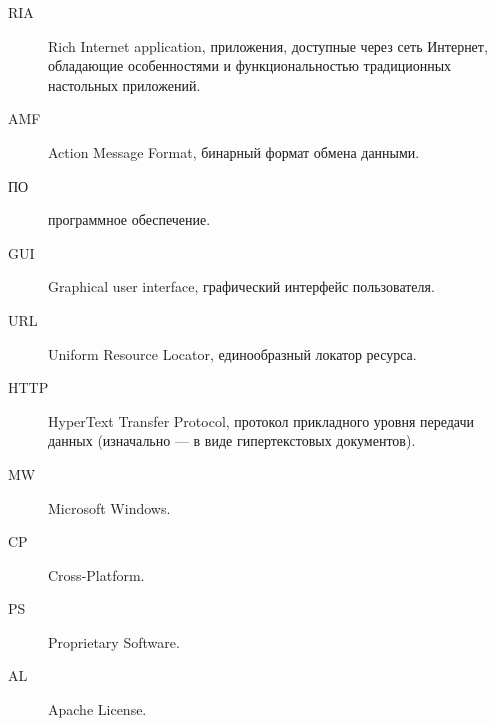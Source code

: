 \Abbreviations %
\begin{description}
\item[RIA] Rich Internet application, приложения, доступные через сеть Интернет, обладающие особенностями и
функциональностью традиционных настольных приложений.
\item[AMF] Action Message Format, бинарный формат обмена данными.
\item[ПО] программное обеспечение.
\item[GUI] Graphical user interface, графический интерфейс пользователя.
\item[URL] Uniform Resource Locator, единообразный локатор ресурса.
\item[HTTP] HyperText Transfer Protocol,  протокол прикладного уровня передачи данных (изначально — в виде
гипертекстовых документов).
\item[MW] Microsoft Windows.
\item[CP] Cross-Platform.
\item[PS] Proprietary Software.
\item[AL] Apache License.
\end{description}
